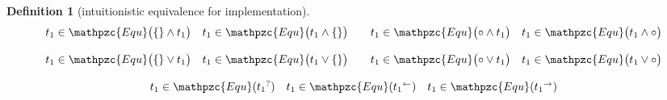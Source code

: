 \documentclass[12pt]{article}
\newtheorem{Definition}{Definition}[section]
\begin{document}
\begin{Definition}[intuitionistic equivalence for implementation]
\begin{displaymath}
\begin{array}{c}
      \begin{array}{ll}
        \begin{array}{ll}
          t_1 \in \mathpzc{Equ}\bigl(\{\} \wedge t_1 \bigr)
          & t_1 \in \mathpzc{Equ}\bigl(t_1 \wedge \{\} \bigr)
        \end{array}
        & \begin{array}{ll}
            t_1 \in \mathpzc{Equ}\bigl(\circ \wedge t_1 \bigr)
            & t_1 \in \mathpzc{Equ}\bigl(t_1 \wedge \circ \bigr)
          \end{array}
      \end{array}  \\
      \\
      
      \begin{array}{ll}
        \begin{array}{ll}
          t_1 \in \mathpzc{Equ}\bigl(\{\} \vee t_1 \bigr)
          & t_1 \in \mathpzc{Equ}\bigl(t_1 \vee \{\} \bigr)
        \end{array}
        & \begin{array}{ll}
            t_1 \in \mathpzc{Equ}\bigl(\circ \vee t_1 \bigr)
            & t_1 \in \mathpzc{Equ}\bigl(t_1 \vee \circ \bigr)
          \end{array}
      \end{array}  \\
      \\
      
      \begin{array}{lll}
        t_1 \in \mathpzc{Equ}({t_1}^?)
        & t_1 \in \mathpzc{Equ}({t_1}^{\leftarrow})
        & t_1 \in \mathpzc{Equ}({t_1}^{\rightarrow})
      \end{array}
      
    \end{array}
  \end{displaymath}
\end{Definition}
\end{document}
